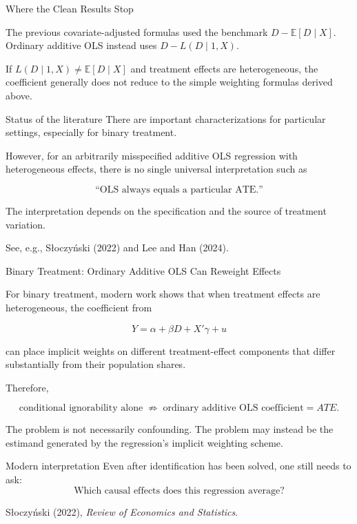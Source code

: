 \documentclass[aspectratio=169,11pt]{beamer}
\begin{document}
\begin{frame}{Where the Clean Results Stop}
\small

The previous covariate-adjusted formulas used the benchmark
\(D-\mathbb{E}[D\mid X]\).
Ordinary additive OLS instead uses
\(D-L(D\mid 1,X)\).

\medskip

If \(L(D\mid 1,X)\neq\mathbb{E}[D\mid X]\)
and treatment effects are heterogeneous, the coefficient generally
does \alert{not} reduce to the simple weighting formulas derived above.

\medskip

\begin{alertblock}{Status of the literature}
There are important characterizations for particular settings,
especially for binary treatment.

However, for an arbitrarily misspecified additive OLS regression
with heterogeneous effects, there is no single universal
interpretation such as

\[
\text{``OLS always equals a particular ATE.''}
\]

The interpretation depends on the specification and the source of
treatment variation.
\end{alertblock}

\scriptsize
See, e.g., S{\l}oczy\'nski (2022) and Lee and Han (2024).

\end{frame}


\begin{frame}{Binary Treatment: Ordinary Additive OLS Can Reweight Effects}
\small

For binary treatment, modern work shows that when treatment effects
are heterogeneous, the coefficient from

\[
Y=\alpha+\beta D+X'\gamma+u
\]

can place implicit weights on different treatment-effect components
that differ substantially from their population shares.

\medskip

Therefore,

\[
\boxed{
\text{conditional ignorability alone}
\;\not\Rightarrow\;
\text{ordinary additive OLS coefficient}=ATE.
}
\]

The problem is not necessarily confounding.
The problem may instead be the estimand generated by the regression's
implicit weighting scheme.

\begin{block}{Modern interpretation}
Even after identification has been solved, one still needs to ask:
\[
\boxed{
\text{Which causal effects does this regression average?}
}
\]
\end{block}

\scriptsize
S{\l}oczy\'nski (2022), \emph{Review of Economics and Statistics}.

\end{frame}
\end{document}

